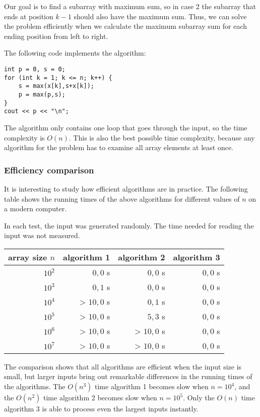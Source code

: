 Our goal is to find a subarray with maximum sum,
so in case 2 the subarray that ends at position $k-1$
should also have the maximum sum.
Thus, we can solve the problem efficiently
when we calculate the maximum subarray sum
for each ending position from left to right.

The following code implements the algorithm:
\begin{lstlisting}
int p = 0, s = 0;
for (int k = 1; k <= n; k++) {
    s = max(x[k],s+x[k]);
    p = max(p,s);
}
cout << p << "\n";
\end{lstlisting}

The algorithm only contains one loop
that goes through the input,
so the time complexity is $O(n)$.
This is also the best possible time complexity,
because any algorithm for the problem
has to examine all array elements at least once.

\subsubsection{Efficiency comparison}

It is interesting to study how efficient 
algorithms are in practice.
The following table shows the running times
of the above algorithms for different
values of $n$ on a modern computer.

In each test, the input was generated randomly.
The time needed for reading the input was not
measured.

\begin{center}
\begin{tabular}{rrrr}
array size $n$ & algorithm 1 & algorithm 2 & algorithm 3 \\
\hline
$10^2$ & $0{,}0$ s & $0{,}0$ s & $0{,}0$ s \\
$10^3$ & $0{,}1$ s & $0{,}0$ s & $0{,}0$ s \\
$10^4$ & > $10,0$ s & $0{,}1$ s & $0{,}0$ s \\
$10^5$ & > $10,0$ s & $5{,}3$ s & $0{,}0$ s \\
$10^6$ & > $10,0$ s & > $10,0$ s & $0{,}0$ s \\
$10^7$ & > $10,0$ s & > $10,0$ s & $0{,}0$ s \\
\end{tabular}
\end{center}

The comparison shows that all algorithms
are efficient when the input size is small,
but larger inputs bring out remarkable
differences in the running times of the algorithms.
The $O(n^3)$ time algorithm 1 becomes slow
when $n=10^4$, and the $O(n^2)$ time algorithm 2
becomes slow when $n=10^5$.
Only the $O(n)$ time algorithm 3 is able to process
even the largest inputs instantly.
